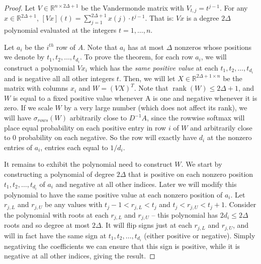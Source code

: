\documentclass{article}
\newcommand{\R}{\mathbb{R}}
\DeclareMathOperator{\rank}{rank}
\begin{document}
\begin{proof}

Let $V \in \R^{n \times 2\Delta+1}$ be the Vandermonde matrix with $V_{t,j} = t^{j-1}$. For any $x \in \R^{2\Delta+1}$, $[Vx](t) = \sum_{j = 1}^{2\Delta+1} x({j}) \cdot t^{j-1}$. That is: $Vx$ is a degree $2\Delta$  polynomial evaluated at the integers $t = 1,\ldots,n$.

Let  $a_i$ be the $i^{th}$ row of $A$. Note that $a_i$ has at most $\Delta$ nonzeros whose positions we denote by $t_1,t_2,\ldots,t_{d_i}$.
To prove the theorem, for each row $a_i$, we will construct a polynomial $Vx_i$ which has the \emph{same positive value} at each $t_1,t_2,\ldots,t_{d_i}$ and is negative all all other integers $t$. Then, we will let $X \in \R^{2\Delta +1 \times n}$ be the matrix with columns $x_{i}$ and $W = (VX)^T $. Note that $\rank(W) \le 2\Delta+1$, and $W$ is equal to a fixed positive value whenever A is one and negative whenever it is zero. If we scale $W$ by a very large number (which does not affect its rank), we will have $\sigma_{rows}(W)$ arbitrarily close to $D^{-1} A$, since the rowwise softmax will place equal probability on each positive entry in row $i$ of $W$ and arbitrarily close to $0$ probability on each negative. So the row will exactly have $d_i$ at the nonzero entries of $a_i$, entries each equal to $1/d_i$.

It remains to exhibit the polynomial need to construct $W$. We start by constructing a polynomial of degree $2\Delta$ that is positive on each nonzero position $t_1,t_2,\ldots,t_{d_i}$ of $a_i$ and negative at all other indices. Later we will modify this polynomial to have the same positive value at each nonzero position of $a_i$. %
 Let $r_{j,L}$ and $r_{j,U}$ be any values with $t_{j} -1 < r_{j,L} < t_j$ and $t_{j} < r_{j,U} < t_{j} +1$. Consider the polynomial with roots at each $r_{j,L}$ and $r_{j,U}$ -- this polynomial has $2 d_i \le 2\Delta$ roots and so degree at most $2\Delta$. It will flip signs just at each  $r_{j,L}$ and $r_{j,U}$, and will in fact have the same sign at  $t_1,t_2,\ldots,t_{d_i}$ (either positive or negative). Simply negativing the coefficients we can ensure that this sign is positive, while it is negative at all other indices, giving the result. %



\end{proof}
\end{document}
